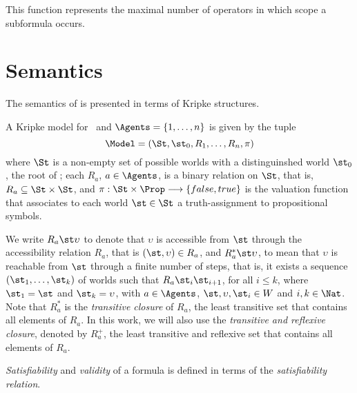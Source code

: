 This function represents the maximal number of operators in which scope a
subformula occurs.

\section{Semantics}
\label{semantics}

The semantics of  is presented in terms of Kripke structures.

\begin{definition}
    A Kripke model for \Prop~and $\Agents = \{1, \ldots, n\}$ is given by the tuple 
    \begin{equation}
        \Model = (\St, \st_0, R_1, \ldots, R_n, \pi)
    \end{equation}
    where $\St$ is a non-empty set of possible worlds with a distinguinshed world
    $\st_0$, the root of \Model; each $R_a$, $a \in \Agents$, is a binary relation
    on $\St$, that is, $R_a \subseteq \St \times \St$, and $\pi: \St \times \Prop
    \longrightarrow \{false, true\}$ is the valuation function that associates
    to each world $\st \in \St$ a truth-assignment to propositional symbols.
\end{definition}

We write $R_a \st \upsilon$ to denote that $\upsilon$ is accessible from $\st$ through
the accessibility relation $R_a$, that is $(\st, \upsilon) \in R_a$, and $R^*_a \st
\upsilon$, to mean that $\upsilon$ is reachable from $\st$ through a finite number of
steps, that is, it exists a sequence $(\st_1, \ldots, \st_k)$ of worlds such that
$R_a \st_i \st_{i+1}$, for all $i \leq k$, where $\st_1 = \st$ and $\st_k =
\upsilon$, with $a \in \Agents$, $\st, \upsilon, \st_i \in W$ and $i, k \in \Nat$. Note
that $R_a^*$ is the \emph{transitive closure} of $R_a$, the least transitive set
that contains all elements of $R_a$. In this work, we will also use the
\emph{transitive and reflexive closure}, denoted by $R_a^+$, the least
transitive and reflexive set that contains all elements of $R_a$.

\emph{Satisfiability} and \emph{validity} of a formula is defined in terms of the \emph{satisfiability relation}.

